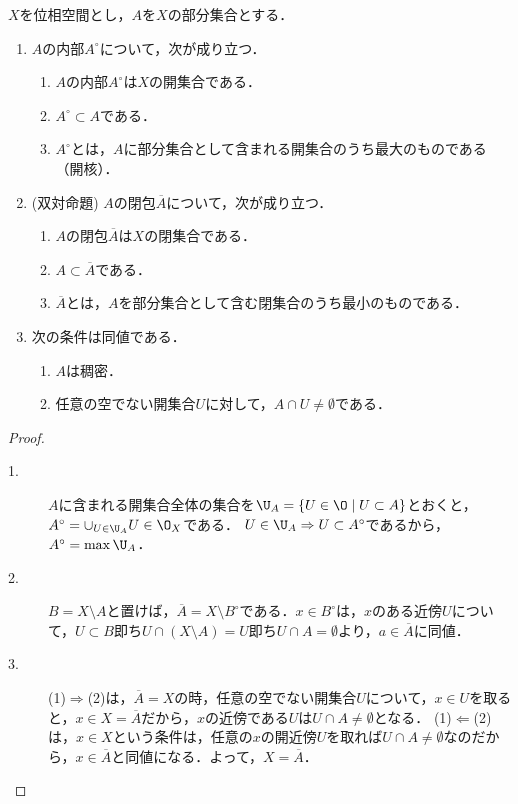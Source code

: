 \documentclass[uplatex,dvipdfmx]{jsreport}
\begin{document}
\begin{proposition}[内部，閉包，稠密の特徴付け]
    $X$を位相空間とし，$A$を$X$の部分集合とする．
    \begin{enumerate}
        \item $A$の内部$A^\circ$について，次が成り立つ．
        \begin{enumerate}[(1)]
            \item $A$の内部$A^\circ$は$X$の開集合である．
            \item $A^\circ\subset A$である．
            \item $A^\circ$とは，$A$に部分集合として含まれる開集合のうち最大のものである（開核）．
        \end{enumerate}
        \item (双対命題) $A$の閉包$\overline{A}$について，次が成り立つ．
        \begin{enumerate}[(1)]
            \item $A$の閉包$\overline{A}$は$X$の閉集合である．
            \item $A\subset\overline{A}$である．
            \item $\overline{A}$とは，$A$を部分集合として含む閉集合のうち最小のものである．
        \end{enumerate}
        \item 次の条件は同値である．\begin{enumerate}[(1)]
            \item $A$は稠密．
            \item 任意の空でない開集合$U$に対して，$A\cap U\ne\emptyset$である．
        \end{enumerate}
    \end{enumerate}
\end{proposition}
\begin{proof}\mbox{}
    \begin{description}
        \item[1.]
        $A$に含まれる開集合全体の集合を$\U_A=\{U\in\O\mid U\subset A\}$とおくと，$A^\circ=\cup_{U\in\U_A}U\in\O_X$である．
        $U\in\U_A\Rightarrow U\subset A^\circ$であるから，$A^\circ=\max\U_A$．
        \item[2.]
        $B=X\setminus A$と置けば，$\overline{A}=X\setminus B^\circ$である．$x\in B^\circ$は，$x$のある近傍$U$について，$U\subset B$即ち$U\cap(X\setminus A)=U$即ち$U\cap A=\emptyset$より，$a\in\overline{A}$に同値．
        \item[3.]
        (1)$\Rightarrow$(2)は，$\overline{A}=X$の時，任意の空でない開集合$U$について，$x\in U$を取ると，$x\in X=\overline{A}$だから，$x$の近傍である$U$は$U\cap A\ne\emptyset$となる．
        (1)$\Leftarrow$(2)は，$x\in X$という条件は，任意の$x$の開近傍$U$を取れば$U\cap A\ne\emptyset$なのだから，$x\in\overline{A}$と同値になる．よって，$X=\overline{A}$．
    \end{description}
\end{proof}
\end{document}

